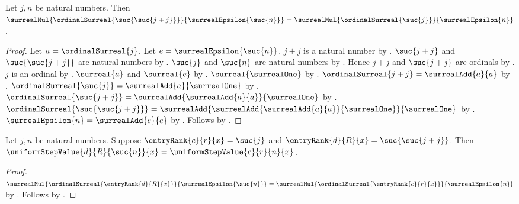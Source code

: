 \begin{lemma}\label{dyadic_after_inserted_rank_product}
    Let $j,n$ be natural numbers.
    Then
        $\surrealMul{\ordinalSurreal{\suc{\suc{j+j}}}}
            {\surrealEpsilon{\suc{n}}}
        =\surrealMul{\ordinalSurreal{\suc{j}}}
            {\surrealEpsilon{n}}$.
\end{lemma}
\begin{proof}
    Let $a=\ordinalSurreal{j}$.
    Let $e=\surrealEpsilon{\suc{n}}$.
    $j+j$ is a natural number by .
    $\suc{j+j}$ and $\suc{\suc{j+j}}$ are natural numbers
        by .
    $\suc{j}$ and $\suc{n}$ are natural numbers
        by .
    Hence $j+j$ and $\suc{j+j}$ are ordinals
        by .
    $j$ is an ordinal by .
    $\surreal{a}$ and $\surreal{e}$
        by
        .
    $\surreal{\surrealOne}$ by .
    $\ordinalSurreal{j+j}=\surrealAdd{a}{a}$
        by .
    $\ordinalSurreal{\suc{j}}
        =\surrealAdd{a}{\surrealOne}$
        by .
    $\ordinalSurreal{\suc{j+j}}
        =\surrealAdd{\surrealAdd{a}{a}}{\surrealOne}$
        by .
    $\ordinalSurreal{\suc{\suc{j+j}}}
        =\surrealAdd{
            \surrealAdd{\surrealAdd{a}{a}}{\surrealOne}}
            {\surrealOne}$
        by .
    $\surrealEpsilon{n}=\surrealAdd{e}{e}$
        by .
    Follows by
        .
\end{proof}

\begin{proposition}\label{uniform_step_value_after_inserted_rank}
    Let $j,n$ be natural numbers.
    Suppose $\entryRank{c}{r}{x}=\suc{j}$ and
        $\entryRank{d}{R}{x}=\suc{\suc{j+j}}$.
    Then
        $\uniformStepValue{d}{R}{\suc{n}}{x}
        =\uniformStepValue{c}{r}{n}{x}$.
\end{proposition}
\begin{proof}
    $\surrealMul{\ordinalSurreal{\entryRank{d}{R}{x}}}
            {\surrealEpsilon{\suc{n}}}
        =\surrealMul{\ordinalSurreal{\entryRank{c}{r}{x}}}
            {\surrealEpsilon{n}}$
        by .
    Follows by .
\end{proof}

